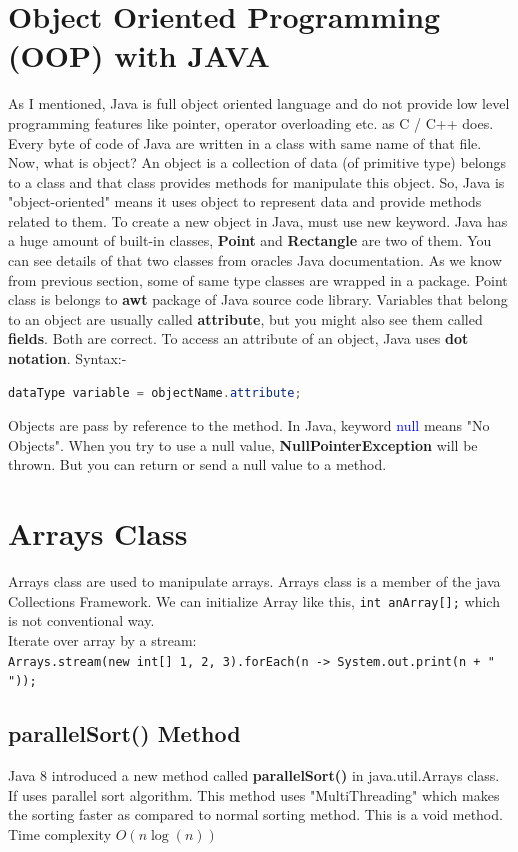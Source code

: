 \documentclass[10 pt]{book}
\begin{document}
\section{Object Oriented Programming (OOP) with \textbf{JAVA}}
As I mentioned, Java is full object oriented language and do not provide low level programming features like pointer, operator overloading etc. as C / C++ does. Every byte of code of Java are written in a class with same name of that file. Now, what is object? An object is a collection of data (of primitive type) belongs to a class and that class provides methods for manipulate this object. So, Java is "object-oriented" means it uses object to represent data and provide methods related to them. To create a new object in Java, must use new keyword. Java has a huge amount of built-in classes, \textbf{Point} and \textbf{Rectangle} are two of them. You can see details of that two classes from oracles Java documentation. As we know from previous section, some of same type classes are wrapped in a package. Point class is belongs to \textbf{awt} package of Java source code library. Variables that belong to an object are usually called \textbf{attribute}, but you might also see them called \textbf{fields}. Both are correct. To access an attribute of an object, Java uses \textbf{dot notation}. Syntax:- \\
\begin{lstlisting}[language = java]
	dataType variable = objectName.attribute;
\end{lstlisting}
Objects are pass by reference to the method. In Java, keyword \textcolor{blue}{null} means "No Objects". When you try to use a null value, \textbf{NullPointerException} will be thrown. But you can return or send a null value to a method.

\section{Arrays Class}
Arrays class are used to manipulate arrays. Arrays class is a member of the java Collections Framework. We can initialize Array like this, \texttt{int anArray[];} which is not conventional way.\\
Iterate over array by a stream:\\
\texttt{\footnotesize Arrays.stream(new int[] {1, 2, 3}).forEach(n -> System.out.print(n + " "));}
\subsection{parallelSort() Method}
Java 8 introduced a new method called \textbf{parallelSort()} in java.util.Arrays class. If uses parallel sort algorithm. This method uses "MultiThreading" which makes the sorting faster as compared to normal sorting method. This is a void method. Time complexity $O(n\log(n))$
\end{document}
